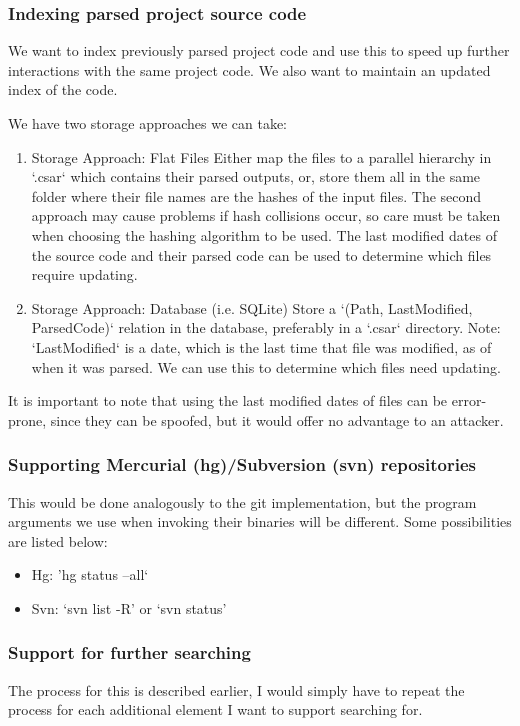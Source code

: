 \documentclass[12pt, letterpaper]{article}
\begin{document}
\subsubsection{Indexing parsed project source code}
We want to index previously parsed project code and use this to speed up further interactions with the same project code.
We also want to maintain an updated index of the code.

We have two storage approaches we can take:
\begin{enumerate}
    \item Storage Approach: Flat Files\newline
    Either map the files to a parallel hierarchy in `.csar` which contains their parsed outputs, or, store them all in the same folder where their file names are the hashes of the input files.
    The second approach may cause problems if hash collisions occur, so care must be taken when choosing the hashing algorithm to be used.
    The last modified dates of the source code and their parsed code can be used to determine which files require updating.
    \item Storage Approach: Database (i.e. SQLite)\newline
    Store a `(Path, LastModified, ParsedCode)` relation in the database, preferably in a `.csar` directory.
    Note: `LastModified` is a date, which is the last time that file was modified, as of when it was parsed.
    We can use this to determine which files need updating.
\end{enumerate}

It is important to note that using the last modified dates of files can be error-prone, since they can be spoofed, but it would offer no advantage to an attacker.

\subsubsection{Supporting Mercurial (hg)/Subversion (svn) repositories}
This would be done analogously to the git implementation, but the program arguments we use when invoking their binaries will be different.
Some possibilities are listed below:
\begin{itemize}
    \item Hg: 'hg status --all`
    \item Svn: `svn list -R' or `svn status'
\end{itemize}

\subsubsection{Support for further searching}
The process for this is described earlier, I would simply have to repeat the process for each additional element I want to support searching for.
\end{document}
